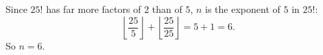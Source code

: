 Since $25!$ has far more factors of $2$ than of $5$, $n$ is the exponent of $5$ in $25!$:
\[
\left\lfloor\dfrac{25}{5}\right\rfloor+\left\lfloor\dfrac{25}{25}\right\rfloor=5+1=6 .
\]
So $n=\boxed{6}$.
